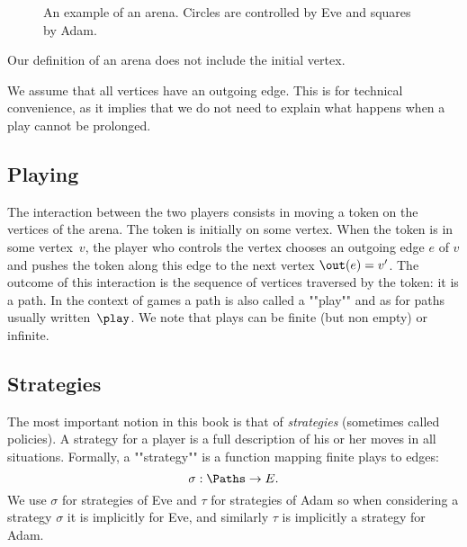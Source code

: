 \begin{figure}
\centering
\caption{An example of an arena. Circles are controlled by Eve and squares by Adam.}
\label{1-fig:arena_example}
\end{figure}
Our definition of an arena does not include the initial vertex. %

\begin{convention}
We assume that all vertices have an outgoing edge.
This is for technical convenience, as it implies that we do not need to explain what happens when a play cannot be prolonged.
\end{convention}

\subsection*{Playing}
The interaction between the two players consists in moving a token on the vertices of the arena.
The token is initially on some vertex.
When the token is in some vertex~$v$, the player who controls the vertex chooses an outgoing edge $e$ of $v$
and pushes the token along this edge to the next vertex $\out(e) = v'$.
The outcome of this interaction is the sequence of vertices traversed by the token: it is a path. 
In the context of games a path is also called a ""play"" and as for paths usually written~$\play$.
We note that plays can be finite (but non empty) or infinite.

\subsection*{Strategies}
The most important notion in this book is that of \textit{strategies} (sometimes called policies).
A strategy for a player is a full description of his or her moves in all situations.
Formally, a ""strategy"" is a function mapping finite plays to edges: 
\[
\sigma : \Paths \to E.
\]
We use $\sigma$ for strategies of Eve and $\tau$ for strategies of Adam so when considering a strategy $\sigma$ it is implicitly for Eve,
and similarly $\tau$ is implicitly a strategy for Adam.

